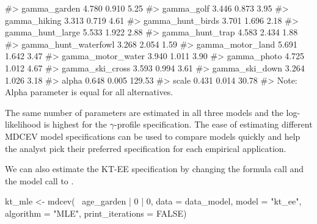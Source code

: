 \begin{Schunk}
\begin{Soutput}
#> gamma_garden            4.780   0.910   5.25
#> gamma_golf              3.446   0.873   3.95
#> gamma_hiking            3.313   0.719   4.61
#> gamma_hunt_birds        3.701   1.696   2.18
#> gamma_hunt_large        5.533   1.922   2.88
#> gamma_hunt_trap         4.583   2.434   1.88
#> gamma_hunt_waterfowl    3.268   2.054   1.59
#> gamma_motor_land        5.691   1.642   3.47
#> gamma_motor_water       3.940   1.011   3.90
#> gamma_photo             4.725   1.012   4.67
#> gamma_ski_cross         3.593   0.994   3.61
#> gamma_ski_down          3.264   1.026   3.18
#> alpha                   0.648   0.005 129.53
#> scale                   0.431   0.014  30.78
#> Note: Alpha parameter is equal for all alternatives.
\end{Soutput}
\end{Schunk}

The same number of parameters are estimated in all three models and the
log-likelihood is highest for the \(\gamma\)-profile specification. The
ease of estimating different MDCEV model specifications can be used to
compare models quickly and help the analyst pick their preferred
specification for each empirical application.

We can also estimate the KT-EE specification by changing the formula
call and the model call to .

\begin{Schunk}
\begin{Sinput}
kt_mle <- mdcev(~ age_garden | 0 | 0,
                   data = data_model,
                   model = "kt_ee",
                   algorithm = "MLE",
                   print_iterations = FALSE)
\end{Sinput}
\end{Schunk}

